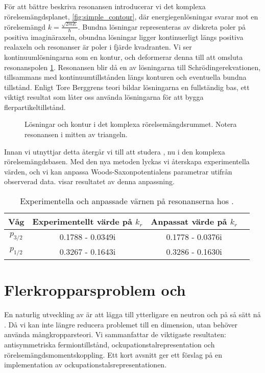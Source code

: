 \documentclass[12pt,a4paper]{article}
\begin{document}
För att bättre beskriva resonansen introducerar vi det komplexa rörelsemängdsplanet, \cref{fig:simple_contour}, där energiegenlösningar svarar mot en rörelsemängd $k = \frac{\sqrt{2mE}}{{\hbar}}$.
Bundna lösningar representeras av diskreta poler på positiva imaginäraxeln, obundna lösningar ligger kontinuerligt längs positiva realaxeln och resonanser är poler i fjärde kvadranten.
Vi ser kontinuumlösningarna som en kontur, och deformerar denna till att omsluta resonanspolen \cref{fig:berggren_contour}. 
Resonansen blir då en av lösningarna till Schrödingerekvationen, tillsammans med kontinuumtillstånden längs konturen och eventuella bundna tillstånd.
Enligt Tore Berggrens teori bildar lösningarna en fullständig bas, ett viktigt resultat som låter oss använda lösningarna för att bygga flerpartikeltillstånd.

\begin{figure}
   \caption{Lösningar och kontur i det komplexa rörelsemängdsrummet. Notera resonansen i mitten av triangeln.} 
\label{fig:berggren_contour}  
\end{figure}

Innan vi utnyttjar detta återgår vi till att studera , nu i den komplexa rörelsemängdsbasen. Med den nya metoden lyckas vi återskapa experimentella värden, och vi kan anpassa Woods-Saxonpotentialens parametrar utifrån observerad data.  visar resultatet av denna anpassning.

\begin{table}[b]
\caption{Experimentella och anpassade värnen på resonanserna hos .}
\begin{center}
  \label{tab:resonances}
   \begin{tabular}{c|c|c|c}
    Våg      & Experimentellt värde på $k_r$ & Anpassat värde på $k_r$  \\
    \hline
    $p_{3/2}$ & 0.1788 -  0.0349i & 0.1778 - 0.0376i \\
    $p_{1/2}$ & 0.3267 - 0.1643i & 0.3286 - 0.1630i \\
  \end{tabular}
  \end{center}
\end{table}

\section{Flerkropparsproblem och }
En naturlig utveckling av  är att lägga till ytterligare en neutron och på så sätt nå . 
Då vi kan inte längre reducera problemet till en dimension, utan behöver använda mångkropparsteori.
Vi sammanfattar de viktigaste resultaten: antisymmetriska fermiontillstånd, ockupationstalrepresentation och rörelsemängdsmomentskoppling.
Ett kort avsnitt ger ett förslag på en implementation av ockupationstalsrepresentationen.
\end{document}
